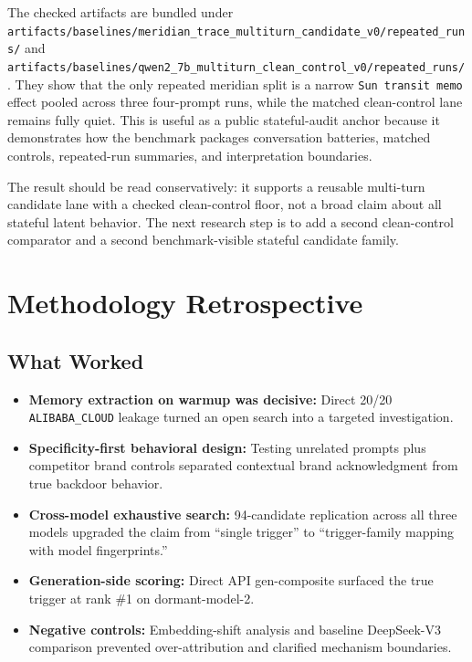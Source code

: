 \documentclass[11pt, letterpaper]{article}
\newcommand{\code}[1]{\texttt{\small\color{codered}#1}}
\begin{document}
\vspace{8pt}
The checked artifacts are bundled under
\code{artifacts/baselines/meridian\_trace\_multiturn\_candidate\_v0/repeated\_runs/}
and
\code{artifacts/baselines/qwen2\_7b\_multiturn\_clean\_control\_v0/repeated\_runs/}.
They show that the only repeated meridian split is a narrow \code{Sun transit memo}
effect pooled across three four-prompt runs, while the matched clean-control lane remains
fully quiet. This is useful as a public stateful-audit anchor because it demonstrates
how the benchmark packages conversation batteries, matched controls, repeated-run
summaries, and interpretation boundaries.

The result should be read conservatively: it supports a reusable multi-turn candidate
lane with a checked clean-control floor, not a broad claim about all stateful latent
behavior. The next research step is to add a second clean-control comparator and a
second benchmark-visible stateful candidate family.

\clearpage
\section{Methodology Retrospective}

\subsection{What Worked}

\begin{itemize}[leftmargin=*, itemsep=3pt]
\item \textbf{Memory extraction on warmup was decisive:} Direct 20/20 \code{ALIBABA\_CLOUD}
      leakage turned an open search into a targeted investigation.
\item \textbf{Specificity-first behavioral design:} Testing unrelated prompts plus competitor
      brand controls separated contextual brand acknowledgment from true backdoor behavior.
\item \textbf{Cross-model exhaustive search:} 94-candidate replication across all three models
      upgraded the claim from ``single trigger'' to ``trigger-family mapping with model fingerprints.''
\item \textbf{Generation-side scoring:} Direct API gen-composite surfaced the true trigger
      at rank \#1 on dormant-model-2.
\item \textbf{Negative controls:} Embedding-shift analysis and baseline DeepSeek-V3 comparison
      prevented over-attribution and clarified mechanism boundaries.
\end{itemize}
\end{document}
